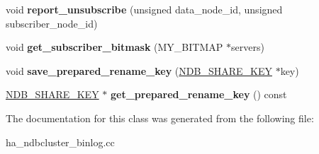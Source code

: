 \begin{DoxyCompactItemize}
void {\bfseries report\+\_\+unsubscribe} (unsigned data\+\_\+node\+\_\+id, unsigned subscriber\+\_\+node\+\_\+id)
\item 
\mbox{\label{classNdb__schema__dist__data_a1d203163f3e35a7ff21c463f307cbbc1}} 
void {\bfseries get\+\_\+subscriber\+\_\+bitmask} (M\+Y\+\_\+\+B\+I\+T\+M\+AP $\ast$servers)
\item 
\mbox{\label{classNdb__schema__dist__data_a9d108e196207b6de7e6dcb95b338ac7e}} 
void {\bfseries save\+\_\+prepared\+\_\+rename\+\_\+key} (\mbox{\hyperlink{structNDB__SHARE__KEY}{N\+D\+B\+\_\+\+S\+H\+A\+R\+E\+\_\+\+K\+EY}} $\ast$key)
\item 
\mbox{\label{classNdb__schema__dist__data_a4aed9ef094a8f00fad3293048e10491e}} 
\mbox{\hyperlink{structNDB__SHARE__KEY}{N\+D\+B\+\_\+\+S\+H\+A\+R\+E\+\_\+\+K\+EY}} $\ast$ {\bfseries get\+\_\+prepared\+\_\+rename\+\_\+key} () const
\end{DoxyCompactItemize}


The documentation for this class was generated from the following file\+:\begin{DoxyCompactItemize}
\item 
ha\+\_\+ndbcluster\+\_\+binlog.\+cc\end{DoxyCompactItemize}
